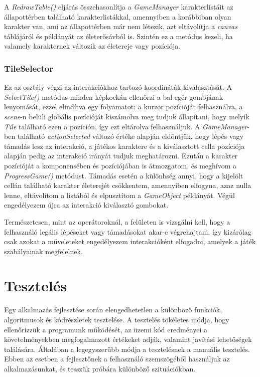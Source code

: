 \documentclass[
]{thesis-ekf}
\theoremstyle{definition}
\theoremstyle{remark}
\begin{document}
A \emph{RedrawTable()} eljárás összehasonlítja a \emph{GameManager} karakterlistáit az állapottérben található karakterlistákkal, amennyiben a korábbiban olyan karakter van, ami az állapottérben már nem létezik, azt eltávolítja a \emph{canvas} táblájáról és példányát az életerősávból is. Szintén ez a metódus kezeli, ha valamely karakternek változik az életereje vagy pozíciója.

\subsection{TileSelector} \label{tileselector}

Ez az osztály végzi az interakciókhoz tartozó koordináták kiválasztását. A \emph{SelectTile()} metódus minden képkockán ellenőrzi a bal egér gombjának lenyomását, ezzel elindítva egy folyamatot: a kurzor pozícióját felhasználva, a \emph{scene}-n belüli globális pozícióját kiszámolva meg tudjuk állapítani, hogy melyik \emph{Tile} található ezen a pozíción, így ezt eltárolva felhasználjuk. A \emph{GameManager}-ben található \emph{actionSelected} változó értéke alapján eldöntjük, hogy lépés vagy támadás lesz az interakció, a játékos karaktere és a kiválasztott cella pozíciója alapján pedig az interakció irányát tudjuk meghatározni. Ezután a karakter pozícióját a komponensében és pozíciójában is átmozgatom, és meghívom a \emph{ProgressGame()} metódust. Támadás esetén a különbség annyi, hogy a kijelölt cellán található karakter életerejét csökkentem, amennyiben elfogyna, azaz nulla lenne, eltávolítom a listából és elpusztítom a \emph{GameObject} példányát. Végül engedélyezem újra az interakció kiválasztó gombokat.

Természetesen, mint az operátoroknál, a felületen is vizsgálni kell, hogy a felhasználó legális lépéseket vagy támadásokat akar-e végrehajtani, így kizárólag csak azokat a műveleteket engedélyezem interakcióként elfogadni, amelyek a játék szabályainak megfelelnek.



\chapter{Tesztelés}

Egy alkalmazás fejlesztése során elengedhetetlen a különböző funkciók, algoritmusok és kódrészletek tesztelése. A tesztelés tökéletes módja, hogy ellenőrizzük a programunk működését, az üzemi kód eredményei a követelményekben megfogalmazott értékeket adják, valamint javítási lehetőségek találására. Általában a legegyszerűbb módja a tesztelésnek a manuális tesztelés. Ebben az esetben a fejlesztőnek a felhasználó szemszögéből használjuk az alkalmazásunkat, és tesszük próbára különböző szituációkban.
\end{document}
